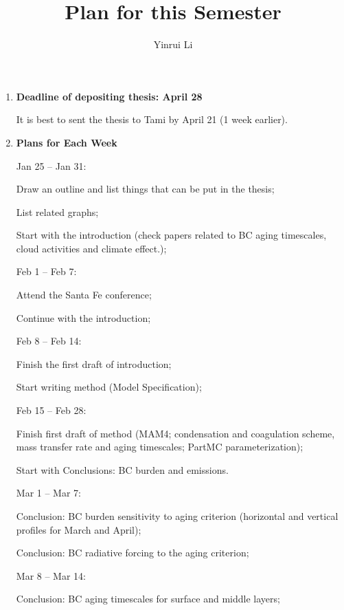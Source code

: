 \documentclass[11pt]{article}
\title{\textbf{Plan for this Semester}}
\author{Yinrui Li}
\date{}
\begin{document}
	\maketitle
	
	\begin{enumerate}
		\item \textbf{Deadline of depositing thesis: April 28} 
		
		It is best to sent the thesis to Tami by April 21 (1 week earlier).
		
		\item \textbf{Plans for Each Week}
		
		Jan 25 -- Jan 31: 
		
		Draw an outline and list things that can be put in the thesis;
		
		List related graphs;
		
		Start with the introduction (check papers related to BC aging timescales, cloud activities and climate effect.);
		
		\bigskip
		
		Feb 1 -- Feb 7:
		
		Attend the Santa Fe conference;
		
		Continue with the introduction; 
		
		\bigskip
		
		Feb 8 -- Feb 14:
		
		Finish the first draft of introduction;
		
		Start writing method (Model Specification);
		
		\bigskip
		
		Feb 15 -- Feb 28:
		
		Finish first draft of method (MAM4; condensation and coagulation scheme, mass transfer rate and aging timescales; PartMC parameterization);
		
		Start with Conclusions: BC burden and emissions.
		
		\bigskip
		
		Mar 1 -- Mar 7:		
		
		Conclusion: BC burden sensitivity to aging criterion (horizontal and vertical profiles for March and April);
		
		Conclusion: BC radiative forcing to the aging criterion;
		
		\bigskip
		
		Mar 8 -- Mar 14:
		
		Conclusion: BC aging timescales for surface and middle layers;
		

\end{enumerate}
\end{document}
